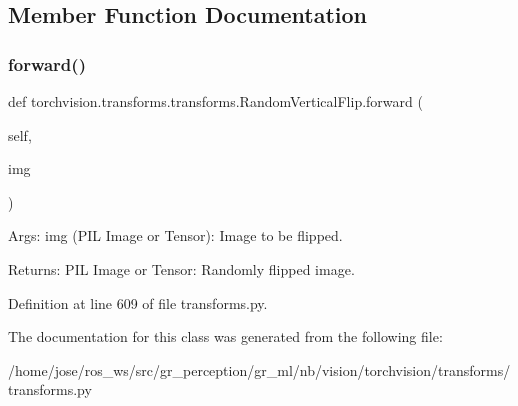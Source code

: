 \subsection{Member Function Documentation}
\mbox{\label{classtorchvision_1_1transforms_1_1transforms_1_1RandomVerticalFlip_ad1a03725ddc2f109fdd1064cc11a4d35}} 
\subsubsection{\texorpdfstring{forward()}{forward()}}
{\footnotesize\ttfamily def torchvision.\+transforms.\+transforms.\+Random\+Vertical\+Flip.\+forward (\begin{DoxyParamCaption}\item[{}]{self,  }\item[{}]{img }\end{DoxyParamCaption})}

\begin{DoxyVerb}Args:
    img (PIL Image or Tensor): Image to be flipped.

Returns:
    PIL Image or Tensor: Randomly flipped image.
\end{DoxyVerb}
 

Definition at line 609 of file transforms.\+py.



The documentation for this class was generated from the following file\+:\begin{DoxyCompactItemize}
\item 
/home/jose/ros\+\_\+ws/src/gr\+\_\+perception/gr\+\_\+ml/nb/vision/torchvision/transforms/transforms.\+py\end{DoxyCompactItemize}
